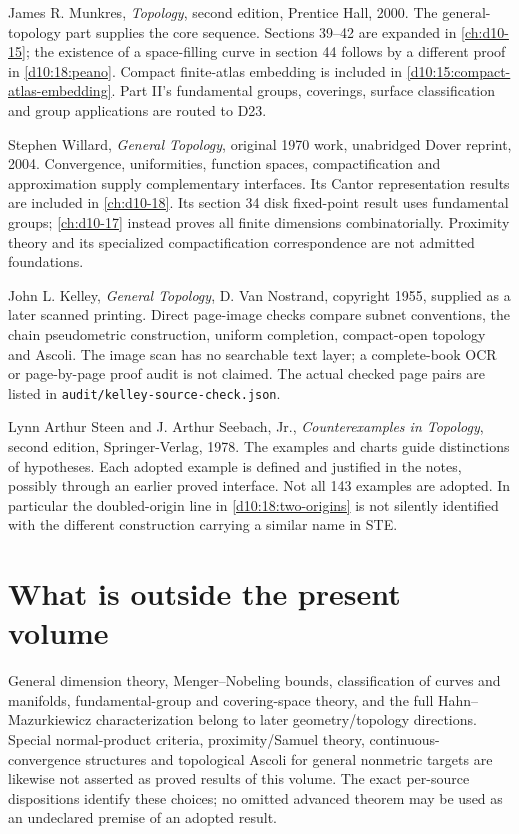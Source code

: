 \documentclass[11pt,oneside,openany]{book}
\theoremstyle{definition}
\theoremstyle{remark}
\newcounter{foundation}
\begin{document}
\begin{description}[style=nextline,leftmargin=12mm]
\item[MUN] James R. Munkres, \emph{Topology}, second edition, Prentice Hall,
2000. The general-topology part supplies the core sequence. Sections
39--42 are expanded in \cref{ch:d10-15}; the existence of a space-filling
curve in section 44 follows by a different proof in
\cref{d10:18:peano}. Compact finite-atlas embedding is included in
\cref{d10:15:compact-atlas-embedding}. Part II's fundamental groups,
coverings, surface classification and group applications are routed to D23.
\item[WIL] Stephen Willard, \emph{General Topology}, original 1970 work,
unabridged Dover reprint, 2004. Convergence, uniformities, function spaces,
compactification and approximation supply complementary interfaces.
Its Cantor representation results are included in
\cref{ch:d10-18}. Its section 34 disk fixed-point result uses fundamental
groups; \cref{ch:d10-17} instead proves all finite dimensions
combinatorially. Proximity theory and its specialized compactification
correspondence are not admitted foundations.
\item[KEL] John L. Kelley, \emph{General Topology}, D. Van Nostrand,
copyright 1955, supplied as a later scanned printing. Direct page-image
checks compare subnet conventions, the chain pseudometric construction,
uniform completion, compact-open topology and Ascoli.
The image scan has no searchable text layer; a complete-book OCR or
page-by-page proof audit is not claimed. The actual checked page pairs
are listed in \texttt{audit/kelley-source-check.json}.
\item[STE] Lynn Arthur Steen and J. Arthur Seebach, Jr.,
\emph{Counterexamples in Topology}, second edition, Springer-Verlag, 1978.
The examples and charts guide distinctions of hypotheses. Each adopted
example is defined and justified in the notes, possibly through an earlier
proved interface. Not all 143 examples are adopted. In particular the
doubled-origin line in \cref{d10:18:two-origins} is not silently identified
with the different construction carrying a similar name in STE.
\end{description}

\section*{What is outside the present volume}
General dimension theory, Menger--Nobeling bounds, classification of curves
and manifolds, fundamental-group and covering-space theory, and the full
Hahn--Mazurkiewicz characterization belong to later geometry/topology
directions. Special normal-product criteria, proximity/Samuel theory,
continuous-convergence structures and topological Ascoli for general
nonmetric targets are likewise not asserted as proved results of this volume.
The exact per-source dispositions identify these choices; no omitted
advanced theorem may be used as an undeclared premise of an adopted result.
\end{document}
